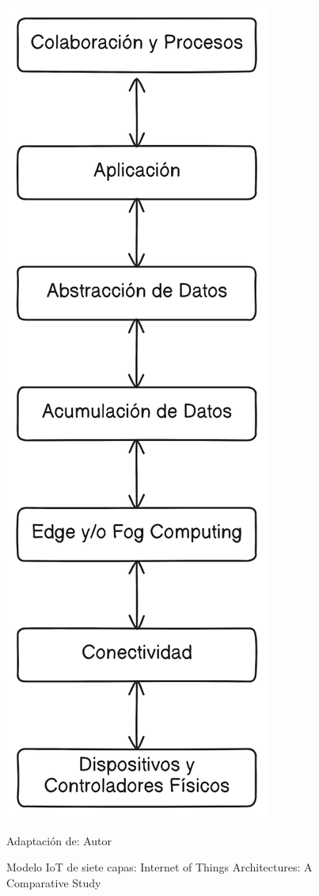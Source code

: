 \documentclass[stu,12pt,floatsintext]{apa7}
\begin{document}
		\begin{figure}[H]
		\centering
		\includegraphics[scale=0.3]{iot_modelo_7_capas}
		\captionsetup{justification=centering}
		\caption{Modelo IoT de siete capas: Internet of Things Architectures: A Comparative Study}
		\small
		\label{iot_siete_capas}
		Adaptación de: Autor
	\end{figure}
	
\end{document}
